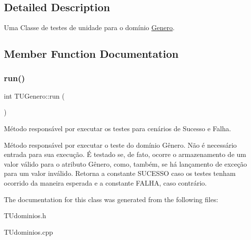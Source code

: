 \subsection{Detailed Description}
Uma Classe de testes de unidade para o domínio \hyperlink{classGenero}{Genero}. 

\subsection{Member Function Documentation}
\mbox{\label{classTUGenero_ade5f70b689c22924dfbd50bfabf0666c}} 
\subsubsection{\texorpdfstring{run()}{run()}}
{\footnotesize\ttfamily int T\+U\+Genero\+::run (\begin{DoxyParamCaption}{ }\end{DoxyParamCaption})}



Método responsável por executar os testes para cenários de Sucesso e Falha. 

Método responsável por executar o teste do domínio Gênero. Não é necessário entrada para sua execução. É testado se, de fato, ocorre o armazenamento de um valor válido para o atributo Gênero, como, também, se há lançamento de exceção para um valor inválido. Retorna a constante S\+U\+C\+E\+S\+SO caso os testes tenham ocorrido da maneira esperada e a constante F\+A\+L\+HA, caso contrário. 

The documentation for this class was generated from the following files\+:\begin{DoxyCompactItemize}
\item 
T\+Udominios.\+h\item 
T\+Udominios.\+cpp\end{DoxyCompactItemize}
